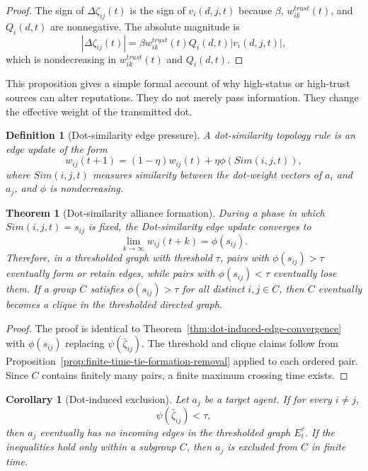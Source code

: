 \documentclass[11pt]{article}
\newtheorem{definition}{Definition}
\newtheorem{theorem}{Theorem}
\newtheorem{corollary}{Corollary}
\theoremstyle{remark}
\begin{document}
\begin{proof}
The sign of $\Delta \zeta_{ij}(t)$ is the sign of $v_i(d,j,t)$ because
$\beta$, $w_{ik}^{trust}(t)$, and $Q_i(d,t)$ are nonnegative. The
absolute magnitude is
$$
|\Delta \zeta_{ij}(t)|=\beta w_{ik}^{trust}(t)Q_i(d,t)|v_i(d,j,t)|,
$$
which is nondecreasing in $w_{ik}^{trust}(t)$ and $Q_i(d,t)$.
\end{proof}

This proposition gives a simple formal account of why high-status or
high-trust sources can alter reputations. They do not merely pass
information. They change the effective weight of the transmitted dot.

\begin{definition}[Dot-similarity edge pressure]\label{def:dot-similarity-edge-pressure}
A dot-similarity topology rule is an edge update of the form
$$
w_{ij}(t+1)=(1-\eta)w_{ij}(t)+\eta\phi(Sim(i,j,t)),
$$
where $Sim(i,j,t)$ measures similarity between the dot-weight vectors of
$a_i$ and $a_j$, and $\phi$ is nondecreasing.
\end{definition}

\begin{theorem}[Dot-similarity alliance formation]\label{thm:dot-similarity-alliance}
During a phase in which $Sim(i,j,t)=s_{ij}$ is fixed, the
Dot-similarity edge update converges to
$$
\lim_{k\to\infty}w_{ij}(t+k)=\phi(s_{ij}).
$$
Therefore, in a thresholded graph with threshold $\tau$, pairs with
$\phi(s_{ij})>\tau$ eventually form or retain edges, while pairs with
$\phi(s_{ij})<\tau$ eventually lose them. If a group $C$ satisfies
$\phi(s_{ij})>\tau$ for all distinct $i,j\in C$, then $C$ eventually
becomes a clique in the thresholded directed graph.
\end{theorem}

\begin{proof}
The proof is identical to
Theorem~\ref{thm:dot-induced-edge-convergence} with
$\phi(s_{ij})$ replacing $\psi(\bar{\zeta}_{ij})$. The threshold and clique claims
follow from Proposition~\ref{prop:finite-time-tie-formation-removal}
applied to each ordered pair. Since $C$ contains finitely many pairs, a
finite maximum crossing time exists.
\end{proof}

\begin{corollary}[Dot-induced exclusion]\label{cor:dot-induced-exclusion}
Let $a_j$ be a target agent. If for every $i\neq j$,
$$
\psi(\bar{\zeta}_{ij})<\tau,
$$
then $a_j$ eventually has no incoming edges in the thresholded graph
$E_t^\tau$. If the inequalities hold only within a subgroup $C$, then
$a_j$ is excluded from $C$ in finite time.
\end{corollary}
\end{document}
